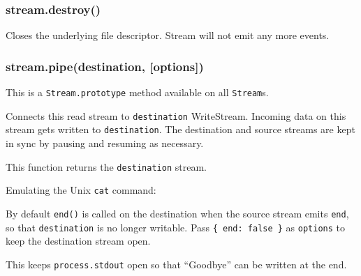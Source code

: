 \subsubsection{stream.destroy()}

Closes the underlying file descriptor. Stream will not emit any more
events.

\subsubsection{stream.pipe(destination, {[}options{]})}

This is a \texttt{Stream.prototype} method available on all
\texttt{Stream}s.

Connects this read stream to \texttt{destination} WriteStream. Incoming
data on this stream gets written to \texttt{destination}. The
destination and source streams are kept in sync by pausing and resuming
as necessary.

This function returns the \texttt{destination} stream.

Emulating the Unix \texttt{cat} command:

\begin{Shaded}
\begin{Highlighting}[]
\NormalTok{();}
\NormalTok{(}\NormalTok{);}
\end{Highlighting}
\end{Shaded}

By default \texttt{end()} is called on the destination when the source
stream emits \texttt{end}, so that \texttt{destination} is no longer
writable. Pass \texttt{\{ end: false \}} as \texttt{options} to keep the
destination stream open.

This keeps \texttt{process.stdout} open so that ``Goodbye'' can be
written at the end.

\begin{Shaded}
\begin{Highlighting}[]
\NormalTok{();}

\NormalTok{(}\NormalTok{, \{ }\NormalTok{: } \NormalTok{\});}

\NormalTok{(}\NormalTok{, }\NormalTok{() \{}
  \NormalTok{(}\NormalTok{);}
\NormalTok{\});}
\end{Highlighting}
\end{Shaded}

